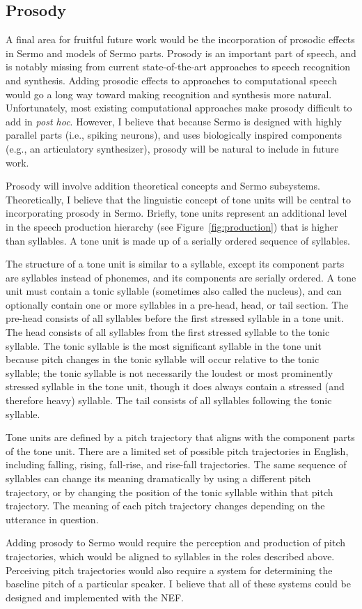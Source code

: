 \subsection{Prosody}

A final area for fruitful future work
would be the incorporation of prosodic effects
in Sermo and models of Sermo parts.
Prosody is an important part of speech,
and is notably missing from
current state-of-the-art approaches
to speech recognition and synthesis.
Adding prosodic effects to approaches
to computational speech would go a long way
toward making recognition and synthesis more natural.
Unfortunately, most existing computational approaches
make prosody difficult to add in
\textit{post hoc}.
However, I believe that because Sermo
is designed with highly parallel parts
(i.e., spiking neurons),
and uses biologically inspired components
(e.g., an articulatory synthesizer),
prosody will be natural to include
in future work.

Prosody will involve addition theoretical concepts
and Sermo subsystems.
Theoretically, I believe that the linguistic concept
of tone units will be central to incorporating
prosody in Sermo.
Briefly, tone units represent an additional
level in the speech production hierarchy
(see Figure~\ref{fig:production})
that is higher than syllables.
A tone unit is made up of a serially ordered
sequence of syllables.

The structure of a tone unit is similar
to a syllable, except its component parts
are syllables instead of phonemes,
and its components are serially ordered.
A tone unit must contain a tonic syllable
(sometimes also called the nucleus),
and can optionally contain one or more syllables
in a pre-head, head, or tail section.
The pre-head consists of all syllables
before the first stressed syllable
in a tone unit.
The head consists of all syllables from
the first stressed syllable
to the tonic syllable.
The tonic syllable is the most significant
syllable in the tone unit because
pitch changes in the tonic syllable
will occur relative to the tonic syllable;
the tonic syllable is not necessarily
the loudest or most prominently stressed
syllable in the tone unit,
though it does always contain
a stressed (and therefore heavy) syllable.
The tail consists of all syllables
following the tonic syllable.

Tone units are defined by
a pitch trajectory that aligns with
the component parts of the tone unit.
There are a limited set of possible
pitch trajectories in English,
including falling, rising,
fall-rise, and rise-fall trajectories.
The same sequence of syllables
can change its meaning dramatically
by using a different pitch trajectory,
or by changing the position of the
tonic syllable within that pitch trajectory.
The meaning of each pitch trajectory
changes depending on the utterance in question.

Adding prosody to Sermo
would require the perception and production
of pitch trajectories,
which would be aligned to syllables
in the roles described above.
Perceiving pitch trajectories would also require
a system for determining the baseline pitch
of a particular speaker.
I believe that all of these systems
could be designed and implemented
with the NEF.
